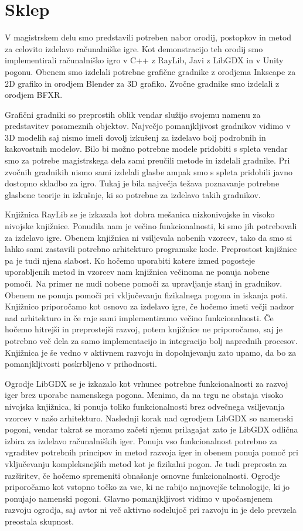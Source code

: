 \documentclass[12pt,a4paper,twoside]{book}
\begin{document}
\chapter{Sklep}\thispagestyle{fancy}
V magistrskem delu smo predstavili potreben nabor orodij, postopkov in metod za celovito izdelavo računalniške igre. Kot demonstracijo teh orodij smo implementirali računalniško igro v C++ z RayLib, Javi z LibGDX in v Unity pogonu. Obenem smo izdelali potrebne grafične gradnike z orodjema Inkscape za 2D grafiko in orodjem Blender za 3D grafiko. Zvočne gradnike smo izdelali z orodjem BFXR.

Grafični gradniki so preprostih oblik vendar služijo svojemu namenu za predstavitev posameznih objektov. Največjo pomanjkljivost gradnikov vidimo v 3D modelih saj nismo imeli dovolj izkušenj za izdelavo bolj podrobnih in kakovostnih modelov. Bilo bi možno potrebne modele pridobiti s spleta vendar smo za potrebe magistrskega dela sami preučili metode in izdelali gradnike. Pri zvočnih gradnikih nismo sami izdelali glasbe ampak smo s spleta pridobili javno dostopno skladbo za igro. Tukaj je bila največja težava poznavanje potrebne glasbene teorije in izkušnje, ki so potrebne za izdelavo takih gradnikov.

Knjižnica RayLib se je izkazala kot dobra mešanica nizkonivojske in visoko nivojske knjižnice. Ponudila nam je večino funkcionalnosti, ki smo jih potrebovali za izdelavo igre. Obenem knjižnica ni vsiljevala nobenih vzorcev, tako da smo si lahko sami zastavili potrebno arhitekturo programske kode. Preprostost knjižnice pa je tudi njena slabost. Ko hočemo uporabiti katere izmed pogosteje uporabljenih metod in vzorcev nam knjižnica večinoma ne ponuja nobene pomoči. Na primer ne nudi nobene pomoči za upravljanje stanj in gradnikov. Obenem ne ponuja pomoči pri vključevanju fizikalnega pogona in iskanja poti. Knjižnico priporočamo kot osnovo za izdelavo igre, če hočemo imeti večji nadzor nad arhitekturo in če raje sami implementiramo večino funkcionalnosti. Če hočemo hitrejši in preprostejši razvoj, potem knjižnice ne priporočamo, saj je potrebno več dela za samo implementacijo in integracijo bolj naprednih procesov. Knjižnica je še vedno v aktivnem razvoju in dopolnjevanju zato upamo, da bo za pomanjkljivosti poskrbljeno v prihodnosti. 

Ogrodje LibGDX se je izkazalo kot vrhunec potrebne funkcionalnosti za razvoj iger brez uporabe namenskega pogona. Menimo, da na trgu ne obstaja visoko nivojska knjižnica, ki ponuja toliko funkcionalnosti brez odvečnega vsiljevanja vzorcev v našo arhitekturo. Naslednji korak nad ogrodjem LibGDX so namenski pogoni, vendar takrat se moramo začeti njemu prilagajat zato je LibGDX odlična izbira za izdelavo računalniških iger. Ponuja vso funkcionalnost potrebno za vgraditev potrebnih principov in metod razvoja iger in obenem ponuja pomoč pri vključevanju kompleksnejših metod kot je fizikalni pogon. Je tudi preprosta za razširitev, če hočemo spremeniti obnašanje osnovne funkcionalnosti. Ogrodje priporočamo kot vstopno točko za vse, ki ne rabijo najnovejše tehnologije, ki jo ponujajo namenski pogoni. Glavno pomanjkljivost vidimo v upočasnjenem razvoju ogrodja, saj avtor ni več aktivno sodelujoč pri razvoju in je delo prevzela preostala skupnost.
\end{document}
